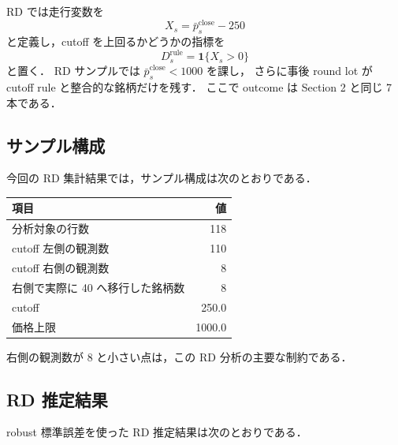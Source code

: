 \documentclass[a4paper,11pt]{jlreq}
\begin{document}
RD では走行変数を
\[
  X_s = \bar{p}^{\mathrm{close}}_s - 250
\]
と定義し，cutoff を上回るかどうかの指標を
\[
  D^{\mathrm{rule}}_s = \mathbf{1}\{X_s > 0\}
\]
と置く．
RD サンプルでは \(\bar{p}^{\mathrm{close}}_s < 1000\) を課し，
さらに事後 round lot が cutoff rule と整合的な銘柄だけを残す．
ここで outcome は Section 2 と同じ 7 本である．

\subsection{サンプル構成}

今回の RD 集計結果では，サンプル構成は次のとおりである．

\begin{center}
\begin{tabular}{lr}
\toprule
項目 & 値 \\
\midrule
分析対象の行数 & 118 \\
cutoff 左側の観測数 & 110 \\
cutoff 右側の観測数 & 8 \\
右側で実際に 40 へ移行した銘柄数 & 8 \\
cutoff & 250.0 \\
価格上限 & 1000.0 \\
\bottomrule
\end{tabular}
\end{center}

右側の観測数が 8 と小さい点は，この RD 分析の主要な制約である．

\subsection{RD 推定結果}

robust 標準誤差を使った RD 推定結果は次のとおりである．
\end{document}
